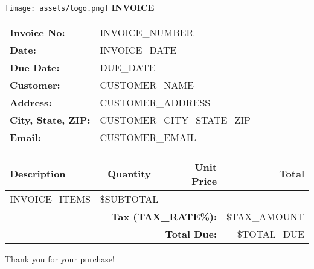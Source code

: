 \documentclass[12pt]{article}
\begin{document}
\begin{center}
    \texttt{[image: assets/logo.png]} %
    \vspace{0.5cm}
    \Huge\textbf{INVOICE}
\end{center}

\vspace{0.5cm}

\begin{tabular}{ll}
    \textbf{Invoice No:} & INVOICE_NUMBER \\
    \textbf{Date:} & INVOICE_DATE \\
    \textbf{Due Date:} & DUE_DATE \\
    \textbf{Customer:} & CUSTOMER_NAME \\
    \textbf{Address:} & CUSTOMER_ADDRESS \\
    \textbf{City, State, ZIP:} & CUSTOMER_CITY_STATE_ZIP \\
    \textbf{Email:} & CUSTOMER_EMAIL \\
\end{tabular}

\vspace{1cm}

\begin{tabular}{|l|c|r|r|}
    \hline
    \textbf{Description} & \textbf{Quantity} & \textbf{Unit Price} & \textbf{Total} \\
    \hline
    INVOICE_ITEMS
    \hline
    \multicolumn{3}{|r|}{\textbf{Subtotal:}} & \$SUBTOTAL \\
    \multicolumn{3}{|r|}{\textbf{Tax (TAX_RATE\%):}} & \$TAX_AMOUNT \\
    \multicolumn{3}{|r|}{\textbf{Total Due:}} & \$TOTAL_DUE \\
    \hline
\end{tabular}

\vspace{1cm}

\begin{center}
    Thank you for your purchase!
\end{center}

\end{document}
